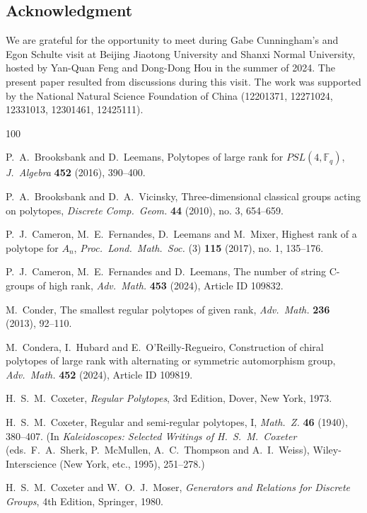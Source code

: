 \documentclass[12pt]{amsart}
\theoremstyle{definition}
\begin{document}
\subsection*{Acknowledgment}
We are grateful for the opportunity to meet during Gabe Cunningham's and Egon Schulte visit at Beijing Jiaotong University and Shanxi Normal University, hosted by Yan-Quan Feng and Dong-Dong Hou in the summer of 2024. The present paper resulted from discussions during this visit. The work was supported by the National Natural Science Foundation of China (12201371, 12271024, 12331013, 12301461, 12425111).

\begin{thebibliography}{100}

 P.~A.~Brooksbank and D.~Leemans, Polytopes of large rank for $PSL(4,\mathbb{F}_q)$, \textit{J.\ Algebra} {\bf 452} (2016), 390--400.

 P.~A.~Brooksbank and D.~A.~Vicinsky, Three-dimensional classical groups acting on polytopes, \textit{Discrete Comp.\ Geom.} {\bf 44} (2010), no. 3, 654--659.

 P.~J.~Cameron, M.~E.~Fernandes, D.~Leemans and M.~Mixer, Highest rank of a polytope for $A_n$, \textit{Proc.\ Lond.\ Math.\ Soc.} (3) {\bf 115} (2017), no. 1, 135--176.

 P.~J.~Cameron, M.~E.~Fernandes and D.~Leemans, The number of string C-groups of high rank, \textit{Adv.\ Math.} {\bf 453} (2024), Article ID 109832.

 M.~Conder, The smallest regular polytopes of given rank, \textit{Adv.\ Math.} {\bf 236} (2013), 92--110.

 M.~Condera, I.~Hubard and E.~O’Reilly-Regueiro, Construction of chiral polytopes of large rank with alternating or symmetric automorphism group,  \textit{Adv.\ Math.} {\bf 452} (2024), Article ID 109819.

 H.~S.~M.~Coxeter, \textit{Regular Polytopes}, 3rd Edition, Dover, New York, 1973.

  H.~S.~M.~Coxeter, Regular and semi-regular polytopes, I,  \textit{
Math.\ Z.}  {\bf 46} (1940), 380--407.  (In \textit{ Kaleidoscopes:  Selected
Writings of H.~S.~M.~Coxeter\/} (eds.\ F.~A.~Sherk, P.~McMullen, A.~C.~Thompson and 
A.~I.~Weiss), Wiley-Interscience (New York, etc., 1995), 251--278.)

 H.~S.~M.~Coxeter and W.~O.~J.~Moser, \textit{Generators and Relations for Discrete Groups}, 4th Edition, Springer, 1980.


\end{thebibliography}
\end{document}
